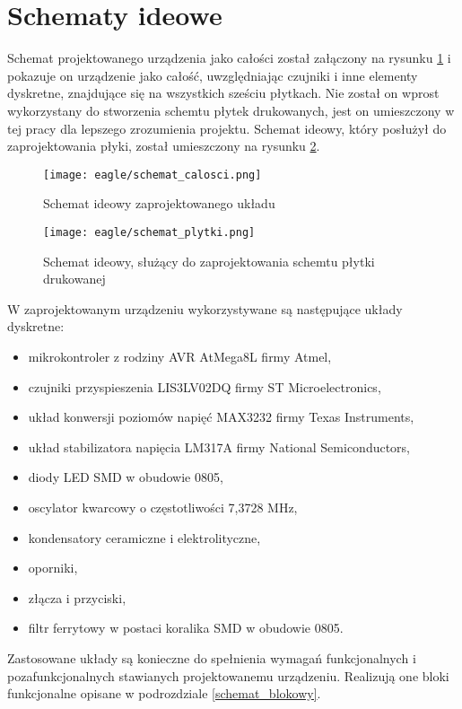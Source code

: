 	\section{Schematy ideowe}
Schemat projektowanego urządzenia jako całości został załączony na rysunku \ref{schemat_calosci} i pokazuje on urządzenie jako całość, uwzględniając czujniki i inne elementy dyskretne, znajdujące się na wszystkich sześciu płytkach. Nie został on wprost wykorzystany do stworzenia schemtu płytek drukowanych, jest on umieszczony w tej pracy dla lepszego zrozumienia projektu. Schemat ideowy, który posłużył do zaprojektowania płyki, został umieszczony na rysunku \ref{schemat_plytki}.
\begin{figure}[p]

  \centering
\texttt{[image: eagle/schemat\_calosci.png]}
  \caption{Schemat ideowy zaprojektowanego układu}
\label{schemat_calosci}
\end{figure}

\begin{figure}[p]
  \centering
\texttt{[image: eagle/schemat\_plytki.png]}
\caption{Schemat ideowy, służący do zaprojektowania schemtu płytki drukowanej}
\label{schemat_plytki}
\end{figure}

W zaprojektowanym urządzeniu wykorzystywane są następujące układy dyskretne:
\begin{itemize}
	\item mikrokontroler z rodziny AVR AtMega8L firmy Atmel,
	\item czujniki przyspieszenia LIS3LV02DQ firmy ST Microelectronics,
	\item układ konwersji poziomów napięć MAX3232 firmy Texas Instruments,
	\item układ stabilizatora napięcia LM317A firmy National Semiconductors,
	\item diody LED SMD w obudowie 0805,
	\item oscylator kwarcowy o częstotliwości 7,3728 MHz,
	\item kondensatory ceramiczne i elektrolityczne,
	\item oporniki,
	\item złącza i przyciski,
	\item filtr ferrytowy w postaci koralika SMD w obudowie 0805.
\end{itemize}
Zastosowane układy są konieczne do spełnienia wymagań funkcjonalnych i pozafunkcjonalnych stawianych projektowanemu urządzeniu. Realizują one bloki funkcjonalne opisane w podrozdziale \ref{schemat_blokowy}.

